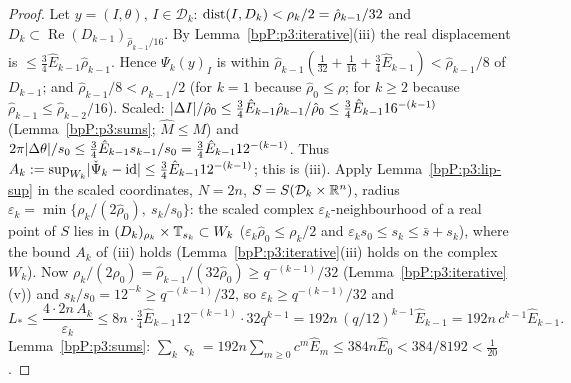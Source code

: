 \begin{proof}
\label{stepP:p3:pl-dom}
Let $y=(I,\theta)$, $I\in\mathcal D_k$: $\operatorname{dist}(I,D_k)<\rho_k/2=\hat\rho_{k-1}/32$ and $D_k\subset\operatorname{Re}(D_{k-1})_{\hat\rho_{k-1}/16}$. By Lemma~\ref{bpP:p3:iterative}(iii) the real displacement is $\le\frac34\hat E_{k-1}\hat\rho_{k-1}$. Hence $\Psi_k(y)_I$ is within $\hat\rho_{k-1}(\frac1{32}+\frac1{16}+\frac34\hat E_{k-1})<\hat\rho_{k-1}/8$ of $D_{k-1}$; and $\hat\rho_{k-1}/8<\rho_{k-1}/2$ (for $k=1$ because $\hat\rho_0\le\rho$; for $k\ge2$ because $\hat\rho_{k-1}\le\hat\rho_{k-2}/16$).
\label{stepP:p3:pl-disp}
Scaled: $\lvert \Delta I\rvert/\hat\rho_0\le\frac34\hat E_{k-1}\hat\rho_{k-1}/\hat\rho_0\le\frac34\hat E_{k-1}16^{-(k-1)}$ (Lemma~\ref{bpP:p3:sums}; $\hat M\le M$) and $2\pi\lvert \Delta\theta\rvert/s_0\le\frac34\hat E_{k-1}s_{k-1}/s_0=\frac34\hat E_{k-1}12^{-(k-1)}$. Thus $A_k:=\sup_{W_k}\lvert \check\Psi_k-\mathrm{id}\rvert\le\frac34\hat E_{k-1}12^{-(k-1)}$; this is (iii).
\label{stepP:p3:pl-lip}
Apply Lemma~\ref{bpP:p3:lip-sup} in the scaled coordinates, $N=2n$, $S=S(\mathcal D_k\times\mathbb{R}^n)$, radius $\varepsilon_k=\min\{\rho_k/(2\hat\rho_0),\ s_k/s_0\}$: the scaled complex $\varepsilon_k$-neighbourhood of a real point of $S$ lies in $(D_k)_{\rho_k}\times\mathbb{T}_{s_k}\subset W_k$ ($\varepsilon_k\hat\rho_0\le\rho_k/2$ and $\varepsilon_ks_0\le s_k\le\bar s+s_k$), where the bound $A_k$ of (iii) holds (Lemma~\ref{bpP:p3:iterative}(iii) holds on the complex $W_k$). Now $\rho_k/(2\hat\rho_0)=\hat\rho_{k-1}/(32\hat\rho_0)\ge q^{-(k-1)}/32$ (Lemma~\ref{bpP:p3:iterative}(v)) and $s_k/s_0=12^{-k}\ge q^{-(k-1)}/32$, so $\varepsilon_k\ge q^{-(k-1)}/32$ and
\[L_*\le\frac{4\cdot2n\,A_k}{\varepsilon_k}\le8n\cdot\tfrac34\hat E_{k-1}12^{-(k-1)}\cdot32q^{k-1}=192n\,(q/12)^{k-1}\hat E_{k-1}=192n\,c^{k-1}\hat E_{k-1}.\]
\label{stepP:p3:pl-sum}
Lemma~\ref{bpP:p3:sums}: $\sum_k\varsigma_k=192n\sum_{m\ge0}c^m\hat E_m\le384n\hat E_0<384/8192<\frac1{20}$.
\end{proof}

